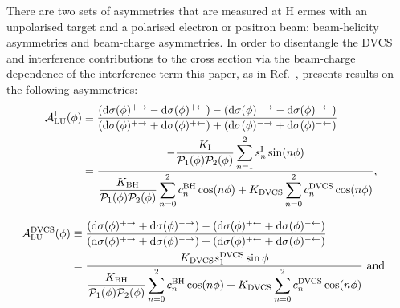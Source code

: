 There are two sets of asymmetries that are measured at H{\sc
ermes} with an unpolarised target and a polarised electron or positron beam:
beam-helicity asymmetries and beam-charge asymmetries. In order to disentangle the DVCS and interference contributions
to the cross section via the beam-charge dependence of the
interference term this paper, as in Ref.~\cite{Air09}, presents results on the following asymmetries:
\begin{align}
\hspace{0.5cm}\mathcal{A}^{\textrm{I}}_{\textrm{LU}}(\phi) &\equiv
\frac{(\textrm{d}\sigma(\phi)^{+\rightarrow} -
\textrm{d}\sigma(\phi)^{+\leftarrow}) -
(\textrm{d}\sigma(\phi)^{-\rightarrow}
- \textrm{d}\sigma(\phi)^{-\leftarrow})}{(\textrm{d}\sigma(\phi)^{+\rightarrow}
+
\textrm{d}\sigma(\phi)^{+\leftarrow}) +
(\textrm{d}\sigma(\phi)^{-\rightarrow}
+ \textrm{d}\sigma(\phi)^{-\leftarrow})}&  \nonumber \\
&=\dfrac{-\dfrac{K_{\textrm{I}}}{\mathcal{P}_{1}(\phi)\mathcal{P}_{2}(\phi)}
\displaystyle\sum_{n=1}^2
s_{n}^{\textrm{I}}\sin(n\phi)}{\dfrac{K_{\textrm{BH}}}{\mathcal{P}_{1}
(\phi)\mathcal{P}_{
2}(\phi)}
\displaystyle\sum_{n=0}^2
c_{n}^{\textrm{BH}}\cos(n\phi) + 
K_{\textrm{DVCS}}\displaystyle\sum_{n=0}^2 c_{n}^{\textrm{DVCS}}\cos(n\phi)},& 
\label{e:alui}
\end{align}

\begin{align}
\mathcal{A}^{\textrm{DVCS}}_{\textrm{LU}}(\phi) &\equiv
\frac{(\textrm{d}\sigma(\phi)^{+\rightarrow} +
\textrm{d}\sigma(\phi)^{-\rightarrow}) -
(\textrm{d}\sigma(\phi)^{+\leftarrow} + 
\textrm{d}\sigma(\phi)^{-\leftarrow})}
{(\textrm{d}\sigma(\phi)^{+\rightarrow} +
\textrm{d}\sigma(\phi)^{-\rightarrow}) +
(\textrm{d}\sigma(\phi)^{+\leftarrow}
+ \textrm{d}\sigma(\phi)^{-\leftarrow})}&  \nonumber \\
&=\dfrac{K_{\textrm{DVCS}}
s_{1}^{\textrm{DVCS}}\sin\phi}{\dfrac{K_{\textrm{BH}}}{\mathcal{P}_{1}
(\phi)\mathcal{P}_{2}(\phi)}
\displaystyle\sum_{n=0}^2
c_{n}^{\textrm{BH}}\cos(n\phi) + 
K_{\textrm{DVCS}}\displaystyle\sum_{n=0}^2
c_{n}^{\textrm{DVCS}}\cos(n\phi)} \textrm{\,\,and}&
\label{e:aludvcs}
\end{align}

